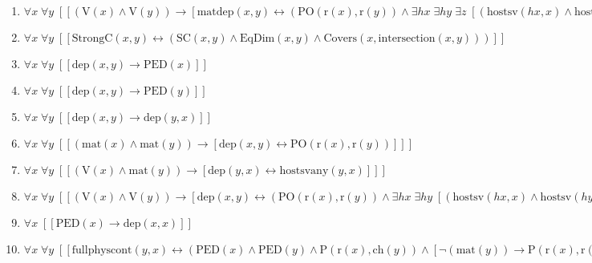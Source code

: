 \documentclass{article}
\begin{document}
\begin{enumerate}
\item $\forall x\; \forall y\;  \left[ \left[ \left(\textrm{V}(x) \land \textrm{V}(y)\right) \rightarrow \left[ \textrm{matdep}(x,y) \leftrightarrow \left(\textrm{PO}(\textrm{r}(x),\textrm{r}(y)) \land \exists hx\; \exists hy\; \exists z\;  \left[ \left(\textrm{hostsv}(hx,x) \land \textrm{hostsv}(hy,y) \land \textrm{mat}(hx) \land \textrm{mat}(hy) \land \textrm{P}(\textrm{r}(hx),\textrm{r}(hy)) \land \textrm{P}(\textrm{r}(hy),\textrm{r}(hx))\right) \right]\right) \right] \right] \right]$
\item $\forall x\; \forall y\;  \left[ \left[ \textrm{StrongC}(x,y) \leftrightarrow \left(\textrm{SC}(x,y) \land \textrm{EqDim}(x,y) \land \textrm{Covers}(x,\textrm{intersection}(x,y))\right) \right] \right]$
\item $\forall x\; \forall y\;  \left[ \left[ \textrm{dep}(x,y) \rightarrow \textrm{PED}(x) \right] \right]$
\item $\forall x\; \forall y\;  \left[ \left[ \textrm{dep}(x,y) \rightarrow \textrm{PED}(y) \right] \right]$
\item $\forall x\; \forall y\;  \left[ \left[ \textrm{dep}(x,y) \rightarrow \textrm{dep}(y,x) \right] \right]$
\item $\forall x\; \forall y\;  \left[ \left[ \left(\textrm{mat}(x) \land \textrm{mat}(y)\right) \rightarrow \left[ \textrm{dep}(x,y) \leftrightarrow \textrm{PO}(\textrm{r}(x),\textrm{r}(y)) \right] \right] \right]$
\item $\forall x\; \forall y\;  \left[ \left[ \left(\textrm{V}(x) \land \textrm{mat}(y)\right) \rightarrow \left[ \textrm{dep}(y,x) \leftrightarrow \textrm{hostsvany}(y,x) \right] \right] \right]$
\item $\forall x\; \forall y\;  \left[ \left[ \left(\textrm{V}(x) \land \textrm{V}(y)\right) \rightarrow \left[ \textrm{dep}(x,y) \leftrightarrow \left(\textrm{PO}(\textrm{r}(x),\textrm{r}(y)) \land \exists hx\; \exists hy\;  \left[ \left(\textrm{hostsv}(hx,x) \land \textrm{hostsv}(hy,y) \land \textrm{mat}(hx) \land \textrm{mat}(hy) \land \left(\textrm{P}(\textrm{r}(hx),\textrm{r}(hy)) \lor \textrm{P}(\textrm{r}(hy),\textrm{r}(hx))\right)\right) \right]\right) \right] \right] \right]$
\item $\forall x\;  \left[ \left[ \textrm{PED}(x) \rightarrow \textrm{dep}(x,x) \right] \right]$
\item $\forall x\; \forall y\;  \left[ \left[ \textrm{fullphyscont}(y,x) \leftrightarrow \left(\textrm{PED}(x) \land \textrm{PED}(y) \land \textrm{P}(\textrm{r}(x),\textrm{ch}(y)) \land \left[ \neg \left(\textrm{mat}(y)\right) \rightarrow \textrm{P}(\textrm{r}(x),\textrm{r}(y)) \right]\right) \right] \right]$

\end{enumerate}
\end{document}
